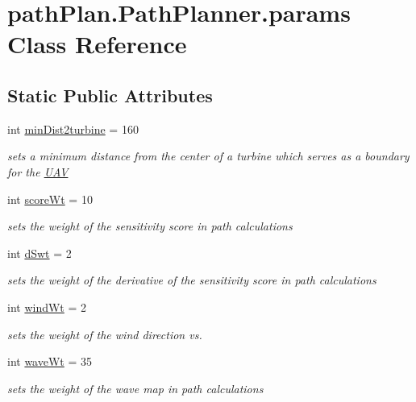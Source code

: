 \hypertarget{classpath_plan_1_1_path_planner_1_1params}{}\section{path\+Plan.\+Path\+Planner.\+params Class Reference}
\label{classpath_plan_1_1_path_planner_1_1params}
\subsection*{Static Public Attributes}
\begin{DoxyCompactItemize}
\item 
int \mbox{\hyperlink{classpath_plan_1_1_path_planner_1_1params_a839dcb73ab2c3b44e4b2f66d9134bfe7}{min\+Dist2turbine}} = 160
\begin{DoxyCompactList}\small\item\em sets a minimum distance from the center of a turbine which serves as a boundary for the \mbox{\hyperlink{classpath_plan_1_1_u_a_v}{U\+AV}} \end{DoxyCompactList}\item 
int \mbox{\hyperlink{classpath_plan_1_1_path_planner_1_1params_aae56a5ff040506a7653180736166bc91}{score\+Wt}} = 10
\begin{DoxyCompactList}\small\item\em sets the weight of the sensitivity score in path calculations \end{DoxyCompactList}\item 
int \mbox{\hyperlink{classpath_plan_1_1_path_planner_1_1params_a610fb5e919a89498e435fded5291dc1a}{d\+Swt}} = 2
\begin{DoxyCompactList}\small\item\em sets the weight of the derivative of the sensitivity score in path calculations \end{DoxyCompactList}\item 
int \mbox{\hyperlink{classpath_plan_1_1_path_planner_1_1params_a0aafe9db7a80b4f22c7e2ad577b8daff}{wind\+Wt}} = 2
\begin{DoxyCompactList}\small\item\em sets the weight of the wind direction vs. \end{DoxyCompactList}\item 
int \mbox{\hyperlink{classpath_plan_1_1_path_planner_1_1params_aa33ac57c3fbbe451c9e8a7a34b237eee}{wave\+Wt}} = 35
\begin{DoxyCompactList}\small\item\em sets the weight of the wave map in path calculations \end{DoxyCompactList}\item 

\end{DoxyCompactItemize}
